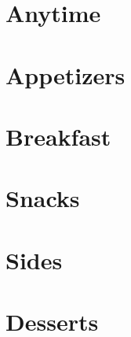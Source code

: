 \documentclass{book}
\begin{document}
\tableofcontents
\chapter{Anytime}




\chapter{Appetizers}


\chapter{Breakfast}


\chapter{Snacks}

\chapter{Sides}

\chapter{Desserts}



\clearpage

\end{document}
